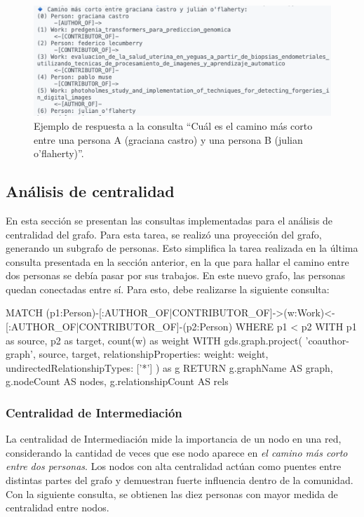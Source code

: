 \documentclass[journal]{IEEEtran}
\begin{document}
\begin{figure}[b]
	\centering
	\includegraphics[width=\linewidth]{imagenes/camino_corto.png}
	\caption{Ejemplo de respuesta a la consulta ``Cuál es el camino más corto entre una persona A (graciana castro) y una persona B (julian o'flaherty)''.}
	\label{fig:camino_corto}
\end{figure}

\subsection{Análisis de centralidad}
En esta sección se presentan las consultas implementadas para el análisis de centralidad del grafo. Para esta tarea, se realizó una proyección del grafo, generando un subgrafo de personas. Esto simplifica la tarea realizada en la última consulta presentada en la sección anterior, en la que para hallar el camino entre dos personas se debía pasar por sus trabajos. En este nuevo grafo, las personas quedan conectadas entre sí. Para esto, debe realizarse la siguiente consulta:

\begin{sflisting}[style=sparql,caption= Consulta para obtener la proyección del grafo de personas,label=codigo2]
	MATCH (p1:Person)-[:AUTHOR_OF|CONTRIBUTOR_OF]->(w:Work)<-[:AUTHOR_OF|CONTRIBUTOR_OF]-(p2:Person)
	WHERE p1 < p2
	WITH p1 as source, p2 as target, count(w) as weight
	WITH gds.graph.project(
	'coauthor-graph',
	source,
	target,
	{relationshipProperties: {weight: weight}},
	{undirectedRelationshipTypes: ['*']}
	) as g
	RETURN g.graphName AS graph, g.nodeCount AS nodes, g.relationshipCount AS rels
\end{sflisting}


\subsubsection{Centralidad de Intermediación}

La centralidad de Intermediación mide la importancia de un nodo en una red, considerando la cantidad de veces que ese nodo aparece en \textit{el camino más corto entre dos personas}. Los nodos con alta centralidad actúan como puentes entre distintas partes del grafo y demuestran fuerte influencia dentro de la comunidad. Con la siguiente consulta, se obtienen las diez personas con mayor medida de centralidad entre nodos.
\end{document}
